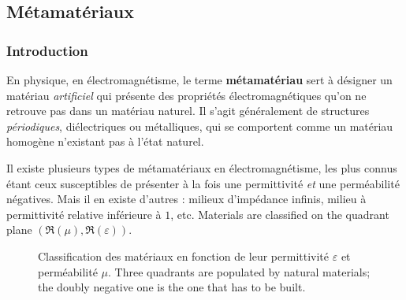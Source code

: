 \subsection{Métamatériaux}

\subsubsection{Introduction}

\begin{definition}
  En physique, en électromagnétisme, le terme \textbf{métamatériau} sert à
  désigner un matériau \emph{artificiel} qui présente des propriétés
  électromagnétiques qu'on ne retrouve pas dans un matériau naturel. Il s'agit
  généralement de structures \emph{périodiques}, diélectriques ou métalliques,
  qui se comportent comme un matériau homogène n'existant pas à l'état naturel.
\end{definition}

Il existe plusieurs types de métamatériaux en électromagnétisme, les plus
connus étant ceux susceptibles de présenter à la fois une permittivité \emph{et}
une perméabilité négatives. Mais il en existe d'autres : milieux d'impédance
infinis, milieu à permittivité relative inférieure à $1$, etc. Materials are
classified on the quadrant plane $(\Re(\mu), \Re(\varepsilon))$.

\begin{figure}[h!]
  \centering
  \caption*{\small Classification des matériaux en fonction de leur
  permittivité $\varepsilon$ et perméabilité $\mu$. Three quadrants are
  populated by natural materials; the doubly negative one is the one that has
  to be built.}
\end{figure}


